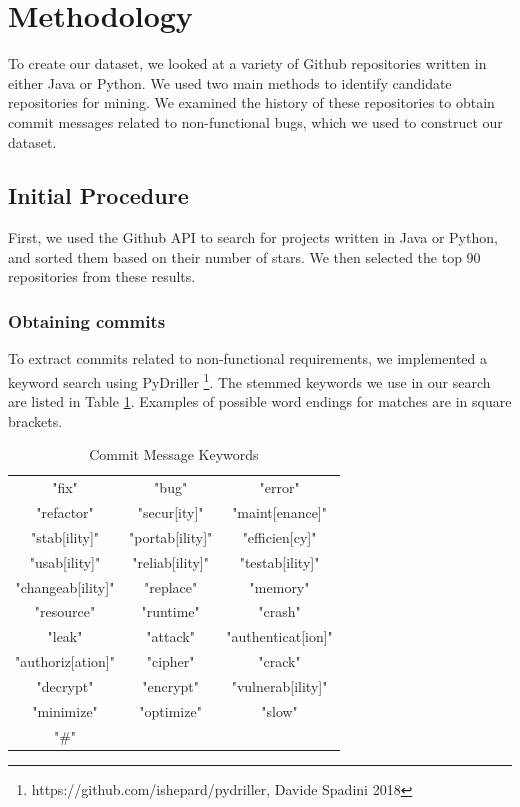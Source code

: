 \documentclass[sigconf]{acmart}
\begin{document}
\section{Methodology}
To create our dataset, we looked at a variety of Github repositories written in either Java or Python. 
We used two main methods to identify candidate repositories for mining. We examined the history of these repositories to obtain commit messages related to non-functional bugs, which we used to construct our dataset.
 
\subsection{Initial Procedure}
First, we used the Github API to search for projects written in Java or Python, and sorted them based on their number of stars. We then selected the top 90 repositories from these results. 

\subsubsection{Obtaining commits}
To extract commits related to non-functional requirements, we implemented a keyword search using PyDriller \footnote{https://github.com/ishepard/pydriller, Davide Spadini 2018}. The stemmed keywords we use in our search are listed in Table \ref{tab:kwds}. Examples of possible word endings for matches are in square brackets.

\begin{table}
  \caption{Commit Message Keywords}
  \label{tab:kwds}
\begin{tabular}{ c c c }
  \toprule
   "fix"             &"bug"           &"error"\\
   "refactor"		 &"secur[ity]"    &"maint[enance]"\\
   "stab[ility]"	 &"portab[ility]" &"efficien[cy]"\\
   "usab[ility]" 	 &"reliab[ility]" &"testab[ility]"\\
   "changeab[ility]" &"replace"       &"memory"\\
   "resource"        &"runtime"       &"crash"\\
   "leak"            &"attack"        &"authenticat[ion]"\\
   "authoriz[ation]" &"cipher"        &"crack" \\ 
   "decrypt"         &"encrypt"       &"vulnerab[ility]"\\ 
   "minimize"        &"optimize"      &"slow"\\
   "\#"              &                &\\
  \bottomrule
\end{tabular}
\end{table}
\end{document}
